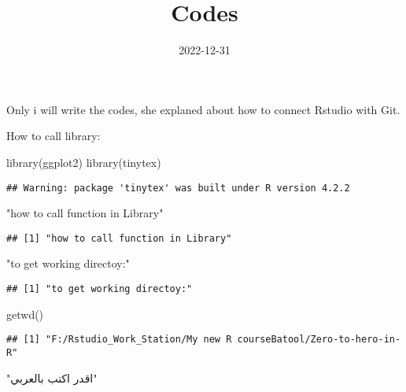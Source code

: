 \documentclass[
]{article}
\title{Codes}
\author{}
\date{\vspace{-2.5em}2022-12-31}
\newenvironment{Shaded}{\begin{snugshade}}{\end{snugshade}}
\newcommand{\FunctionTok}[1]{\textcolor[rgb]{0.00,0.00,0.00}{#1}}
\newcommand{\NormalTok}[1]{#1}
\newcommand{\StringTok}[1]{\textcolor[rgb]{0.31,0.60,0.02}{#1}}
\begin{document}
\maketitle

Only i will write the codes, she explaned about how to connect Rstudio
with Git.

How to call library:

\begin{Shaded}
\begin{Highlighting}[]
\FunctionTok{library}\NormalTok{(ggplot2)}
\FunctionTok{library}\NormalTok{(tinytex)}
\end{Highlighting}
\end{Shaded}

\begin{verbatim}
## Warning: package 'tinytex' was built under R version 4.2.2
\end{verbatim}

\begin{Shaded}
\begin{Highlighting}[]
\StringTok{"how to call function in Library"}
\end{Highlighting}
\end{Shaded}

\begin{verbatim}
## [1] "how to call function in Library"
\end{verbatim}

\begin{Shaded}
\begin{Highlighting}[]
\StringTok{"to get working directoy:"}
\end{Highlighting}
\end{Shaded}

\begin{verbatim}
## [1] "to get working directoy:"
\end{verbatim}

\begin{Shaded}
\begin{Highlighting}[]
\FunctionTok{getwd}\NormalTok{()}
\end{Highlighting}
\end{Shaded}

\begin{verbatim}
## [1] "F:/Rstudio_Work_Station/My new R courseBatool/Zero-to-hero-in-R"
\end{verbatim}

\begin{Shaded}
\begin{Highlighting}[]
\StringTok{"اقدر اكتب بالعربي"}
\end{Highlighting}
\end{Shaded}
\end{document}
